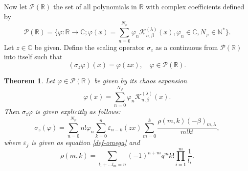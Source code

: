 \documentclass{birkjour}
\newtheorem{thm}{Theorem}[section]
\theoremstyle{definition}
\theoremstyle{remark}
\numberwithin{equation}{section}
\begin{document}
Now let $\mathcal{P}(\mathbb{R})$ the set of all polynomials in
$\mathbb{R}$ with complex coefficients defined by
$$\mathcal{P}(\mathbb{R})=\Big\{\varphi: \mathbb{R}\rightarrow \mathbb{C}; \varphi(x)=
\displaystyle{\sum^{N_{\varphi}}_{n=0}\varphi_{n}\mathcal{K}^{(\lambda)}_{n,
\beta}(x)}, \varphi_{n}\in \mathbb{C}, N_{\varphi}\in
\mathbb{N}^{\ast}\Big\}.$$ Let $z\in \mathbb{C}$ be given. Define
the scaling operator $\sigma_{z}$ as a continuous from
$\mathcal{P}(\mathbb{R})$ into itself such that
$$(\sigma_{z}\varphi)(x)=\varphi(zx), \quad \varphi\in \mathcal{P}(\mathbb{R}).$$
\begin{thm}
Let $\varphi\in \mathcal{P}(\mathbb{R})$ be given by its chaos
expansion
$$\varphi(x)=
\displaystyle{\sum^{N_{\varphi}}_{n=0}\varphi_{n}\mathcal{K}^{(\lambda)}_{n,
\beta}(x)}.$$ Then $\sigma_{z}\varphi$ is given explicitly as
follows:
\begin{equation}\label{scaling-expansion}
\sigma_{z}(\varphi)=\displaystyle{\sum^{N_{\varphi}}_{n=0}n!\varphi_{n}\sum^{n}_{k=0}\varepsilon_{n-k}(zx)\sum^{k}_{m=0}\frac{\rho(m,
k)(-\beta)_{m, \lambda}}{m!k!}},
\end{equation}
where $\varepsilon_{j}$ is given as equation \eqref{def-omega} and
$$\rho(m, k)=\displaystyle{\sum_{l_{1}+\ldots l_{m}=n}(-1)^{n+m}q^{m}k!\prod^{m}_{i=1}\frac{1}{l_{i}}}.$$
\end{thm}
\end{document}
